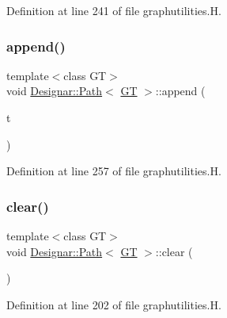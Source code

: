 Definition at line 241 of file graphutilities.\+H.

\mbox{\label{class_designar_1_1_path_a0e69c5a5e1fffd17059b236e13f6587a}} 
\subsubsection{\texorpdfstring{append()}{append()}\hspace{0.1cm}{\footnotesize\ttfamily [2/2]}}
{\footnotesize\ttfamily template$<$class GT$>$ \\
void \hyperlink{class_designar_1_1_path}{Designar\+::\+Path}$<$ \hyperlink{demo-buildgraph_8_c_a3001c40d2c31ca87ed96cd7d1334a55e}{GT} $>$\+::append (\begin{DoxyParamCaption}\item[{\hyperlink{class_designar_1_1_path_a7b499fd50e96e3360968d4cfef7a3736}{Node\+Type} \&}]{t }\end{DoxyParamCaption})\hspace{0.3cm}{\ttfamily [inline]}}



Definition at line 257 of file graphutilities.\+H.

\mbox{\label{class_designar_1_1_path_acc2f49cce82c42701cb703c6d87f6dc2}} 
\subsubsection{\texorpdfstring{clear()}{clear()}}
{\footnotesize\ttfamily template$<$class GT$>$ \\
void \hyperlink{class_designar_1_1_path}{Designar\+::\+Path}$<$ \hyperlink{demo-buildgraph_8_c_a3001c40d2c31ca87ed96cd7d1334a55e}{GT} $>$\+::clear (\begin{DoxyParamCaption}{ }\end{DoxyParamCaption})\hspace{0.3cm}{\ttfamily [inline]}}



Definition at line 202 of file graphutilities.\+H.

\mbox{\label{class_designar_1_1_path_a72950bc3852a17d423982d55326b2382}} 
